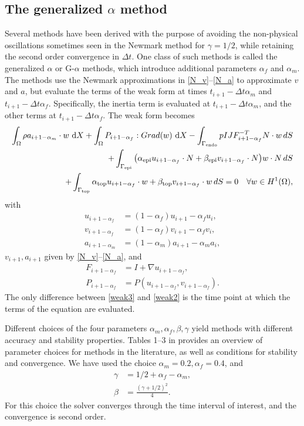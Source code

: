 \documentclass[a4paper,10pt]{article}
\newcommand{\dif}{\mathop{}\!\mathrm{d}}
\newcommand{\dX}{\dif{}X}
\begin{document}
\subsection{The generalized $\alpha$ method}
Several methods have been derived with the purpose of avoiding the non-physical
oscillations sometimes seen in the Newmark method for $\gamma =1/2$, while retaining
the second order convergence in $\Delta t$. One class of such methods is called
the generalized $\alpha$ or G-$\alpha$ methods, which introduce additional parameters
$\alpha_f$ and $\alpha_m$. The methods use the Newmark approximations in
\eqref{N_v}--\eqref{N_a} to approximate $v$ and $a$, but evaluate the terms of the
weak form at times $t_{i+1}-\Delta t\alpha_m$ and  $t_{i+1}-\Delta t\alpha_f$.
Specifically, the inertia term is evaluated at $t_{i+1}-\Delta t\alpha_m$, and the
other terms at $t_{i+1}-\Delta t\alpha_f$. The weak form becomes
\begin{equation}
\begin{aligned}
\int_{\Omega} \rho a_{i+1-\alpha_m} \cdot w \, \dX + \int_{\Omega} P_{i+1-\alpha_f}:Grad(w) \, \dX -\int_{\Gamma_{\rm endo}} p I JF_{i+1-\alpha_f}^{-T}N \cdot w \, dS  \\
+\int_{\Gamma_{\rm epi}} \big(\alpha_{\rm epi} u_{i+1-\alpha_f} \cdot N + \beta_{\rm epi} v_{i+1-\alpha_f} \cdot N \big) w \cdot N \, dS  \\
+\int_{\Gamma_{\rm top}} \alpha_{\rm top} u_{i+1-\alpha_f} \cdot w + \beta_{\rm top} v_{i+1-\alpha_f} \cdot w \, dS = 0 \quad \forall w \in H^1(\Omega),
\end{aligned}\label{weak3}
\end{equation}
with
\begin{align*}
  u_{i+1-\alpha_f} &= (1-\alpha_f)u_{i+1}-\alpha_f u_i, \\
  v_{i+1-\alpha_f} &= (1-\alpha_f)v_{i+1}-\alpha_f v_i, \\
  a_{i+1-\alpha_m} &= (1-\alpha_m)a_{i+1}-\alpha_m a_i,
\end{align*}
$v_{i+1},a_{i+1}$ given by \eqref{N_v}--\eqref{N_a}, and
\begin{align*}
F_{i+1-\alpha_f} &= I + \nabla u_{i+1-\alpha_f}, \\
P_{i+1-\alpha_f} &= P(u_{i+1-\alpha_f}, v_{i+1-\alpha_f}).
\end{align*}
The only difference between \eqref{weak3} and \eqref{weak2} is the time point at which the
terms of the equation are evaluated.

Different choices of the four parameters $\alpha_m, \alpha_f, \beta, \gamma$ yield
methods with different accuracy and stability properties. Tables 1--3 in \cite{erlicher2002analysis}
provides an overview of parameter choices for methods in the literature,
as well as conditions for stability and convergence.
We have used the choice $\alpha_m =0.2, \alpha_f=0.4$, and
\begin{align*}
  \gamma &= 1/2 + \alpha_f-\alpha_m ,\\
  \beta &= \frac{(\gamma + 1/2)^2}{4} .
\end{align*}
For this choice the solver converges through the time interval of interest, and
the convergence is second order.
\end{document}
